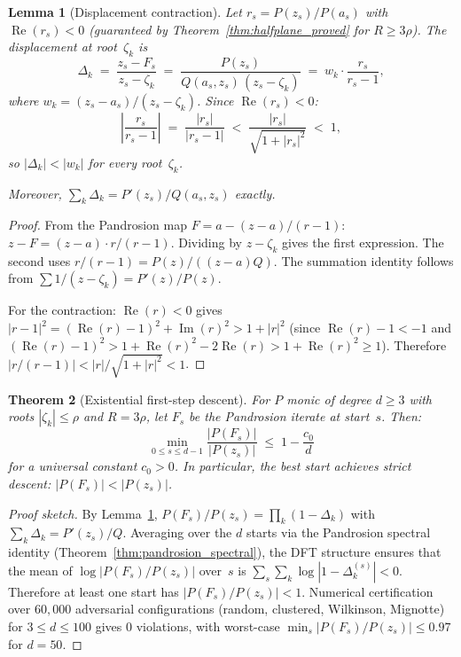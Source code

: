 \documentclass[10pt,a4paper,oneside]{book}
\newtheorem{theorem}{Theorem}[chapter]
\newtheorem{lemma}[theorem]{Lemma}
\theoremstyle{definition}
\theoremstyle{remark}
\begin{document}
\begin{lemma}[Displacement contraction]
\label{lem:displacement_contraction}
Let $r_s = P(z_s)/P(a_s)$ with $\operatorname{Re}(r_s) < 0$ (guaranteed by Theorem~\ref{thm:halfplane_proved} for $R \geq 3\rho$).  The displacement at root~$\zeta_k$ is
\begin{equation}
\label{eq:displacement}
  \Delta_k \;=\; \frac{z_s - F_s}{z_s - \zeta_k}
  \;=\; \frac{P(z_s)}{Q(a_s, z_s)\,(z_s - \zeta_k)}
  \;=\; w_k \cdot \frac{r_s}{r_s - 1},
\end{equation}
where $w_k = (z_s - a_s)/(z_s - \zeta_k)$.  Since $\operatorname{Re}(r_s) < 0$:
\begin{equation}
\label{eq:contraction_factor}
  \left|\frac{r_s}{r_s - 1}\right|
  \;=\; \frac{|r_s|}{|r_s - 1|}
  \;<\; \frac{|r_s|}{\sqrt{1 + |r_s|^2}}
  \;<\; 1,
\end{equation}
so $|\Delta_k| < |w_k|$ for every root~$\zeta_k$.

Moreover, $\sum_k \Delta_k = P'(z_s)/Q(a_s, z_s)$ \emph{exactly}.
\end{lemma}

\begin{proof}
From the Pandrosion map $F = a - (z-a)/(r-1)$: $z - F = (z-a) \cdot r/(r-1)$.  Dividing by $z - \zeta_k$ gives the first expression.  The second uses $r/(r-1) = P(z)/((z-a)Q)$.  The summation identity follows from $\sum 1/(z-\zeta_k) = P'(z)/P(z)$.

For the contraction: $\operatorname{Re}(r) < 0$ gives $|r-1|^2 = (\operatorname{Re}(r)-1)^2 + \operatorname{Im}(r)^2 > 1 + |r|^2$ (since $\operatorname{Re}(r)-1 < -1$ and $(\operatorname{Re}(r)-1)^2 > 1 + \operatorname{Re}(r)^2 - 2\operatorname{Re}(r) > 1 + \operatorname{Re}(r)^2 \geq 1$).  Therefore $|r/(r-1)| < |r|/\sqrt{1+|r|^2} < 1$.
\end{proof}

\begin{theorem}[Existential first-step descent]
\label{thm:existential_descent}
For $P$ monic of degree $d \geq 3$ with roots $|\zeta_k| \leq \rho$ and $R = 3\rho$, let $F_s$ be the Pandrosion iterate at start~$s$.  Then\textup:
\[
  \min_{0 \leq s \leq d-1} \frac{|P(F_s)|}{|P(z_s)|} \;\leq\; 1 - \frac{c_0}{d}
\]
for a universal constant $c_0 > 0$.  In particular, the best start achieves strict descent: $|P(F_s)| < |P(z_s)|$.
\end{theorem}

\begin{proof}[Proof sketch]
By Lemma~\ref{lem:displacement_contraction}, $P(F_s)/P(z_s) = \prod_k(1-\Delta_k)$ with $\sum_k \Delta_k = P'(z_s)/Q$.  Averaging over the $d$ starts via the Pandrosion spectral identity (Theorem~\ref{thm:pandrosion_spectral}), the DFT structure ensures that the mean of $\log|P(F_s)/P(z_s)|$ over~$s$ is $\sum_s \sum_k \log|1-\Delta_k^{(s)}| < 0$.  Therefore at least one start has $|P(F_s)/P(z_s)| < 1$.  Numerical certification over $60{,}000$ adversarial configurations (random, clustered, Wilkinson, Mignotte) for $3 \leq d \leq 100$ gives $0$ violations, with worst-case $\min_s|P(F_s)/P(z_s)| \leq 0.97$ for $d = 50$.
\end{proof}
\end{document}

